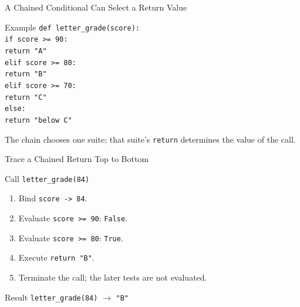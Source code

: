 \documentclass[aspectratio=169,10pt]{beamer}
\begin{document}

\begin{frame}{A Chained Conditional Can Select a Return Value}
  \begin{block}{Example}
    \texttt{def letter\_grade(score):}\\
    \hspace*{0.20in}\texttt{if score >= 90:}\\
    \hspace*{0.40in}\texttt{return "A"}\\
    \hspace*{0.20in}\texttt{elif score >= 80:}\\
    \hspace*{0.40in}\texttt{return "B"}\\
    \hspace*{0.20in}\texttt{elif score >= 70:}\\
    \hspace*{0.40in}\texttt{return "C"}\\
    \hspace*{0.20in}\texttt{else:}\\
    \hspace*{0.40in}\texttt{return "below C"}
  \end{block}

  \begin{keyidea}
    The chain chooses one suite; that suite's \texttt{return} determines the value of the call.
  \end{keyidea}
\end{frame}

\begin{frame}{Trace a Chained Return Top to Bottom}
  \begin{block}{Call}
    \centering
    \Large\texttt{letter\_grade(84)}
  \end{block}

  \begin{enumerate}
    \item Bind \texttt{score -> 84}.
    \item Evaluate \texttt{score >= 90}: \texttt{False}.
    \item Evaluate \texttt{score >= 80}: \texttt{True}.
    \item Execute \texttt{return "B"}.
    \item Terminate the call; the later tests are not evaluated.
  \end{enumerate}

  \begin{block}{Result}
    \centering
    \texttt{letter\_grade(84)} $\longrightarrow$ \texttt{"B"}
  \end{block}
\end{frame}
\end{document}
